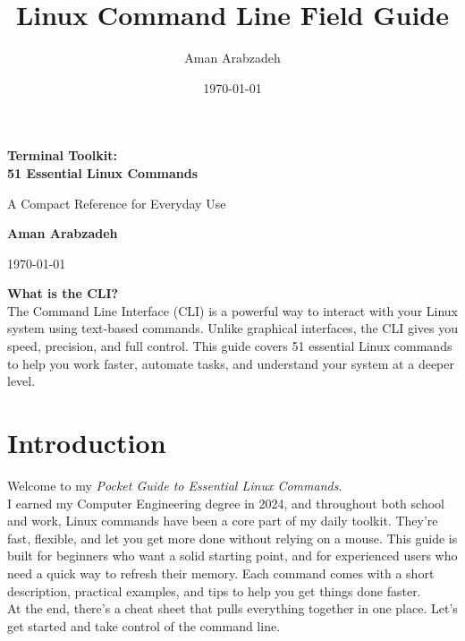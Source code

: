 \documentclass[10pt,oneside]{scrbook}
\title{Linux Command Line Field Guide}
\author{Aman Arabzadeh}
\date{\today}
\begin{document}
\begin{titlepage}
  \centering
  \vspace*{2cm}
  {\Huge\bfseries\color{primary}Terminal Toolkit:\\51 Essential Linux Commands\par}
  \vspace{1cm}
  {\Large\color{secondary}A Compact Reference for Everyday Use\par}
  \vspace{2.5cm}
  {\Large\textbf{Aman Arabzadeh}\par}
  \vspace{1cm}
  {\large\today\par}
  \vfill
  \begin{minipage}{0.85\textwidth}
    \small
    \textbf{What is the CLI?}\\
    The Command Line Interface (CLI) is a powerful way to interact with your Linux system using text-based commands. Unlike graphical interfaces, the CLI gives you speed, precision, and full control. This guide covers 51 essential Linux commands to help you work faster, automate tasks, and understand your system at a deeper level.
  \end{minipage}
\end{titlepage}



\tableofcontents
\small

\mainmatter
\chapter*{Introduction}

Welcome to my \textit{Pocket Guide to Essential Linux Commands}. \\ 
I earned my Computer Engineering degree in 2024, and throughout both school and work, Linux commands have been a core part of my daily toolkit. They’re fast, flexible, and let you get more done without relying on a mouse.
This guide is built for beginners who want a solid starting point, and for experienced users who need a quick way to refresh their memory. Each command comes with a short description, practical examples, and tips to help you get things done faster.
\\
At the end, there’s a cheat sheet that pulls everything together in one place. Let’s get started and take control of the command line.
\end{document}

